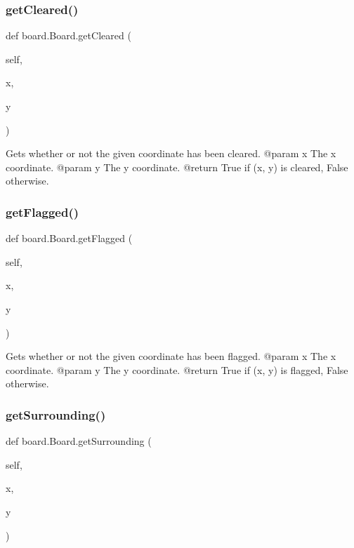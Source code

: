 \subsubsection{\texorpdfstring{getCleared()}{getCleared()}}
{\footnotesize\ttfamily def board.\+Board.\+get\+Cleared (\begin{DoxyParamCaption}\item[{}]{self,  }\item[{}]{x,  }\item[{}]{y }\end{DoxyParamCaption})}

\begin{DoxyVerb}Gets whether or not the given coordinate has been cleared.
@param x The x coordinate.
@param y The y coordinate.
@return True if (x, y) is cleared, False otherwise.
\end{DoxyVerb}
 \mbox{\label{classboard_1_1_board_a1e824cb6d46a2c1cb1e142436b3d012f}} 
\subsubsection{\texorpdfstring{getFlagged()}{getFlagged()}}
{\footnotesize\ttfamily def board.\+Board.\+get\+Flagged (\begin{DoxyParamCaption}\item[{}]{self,  }\item[{}]{x,  }\item[{}]{y }\end{DoxyParamCaption})}

\begin{DoxyVerb}Gets whether or not the given coordinate has been flagged.
@param x The x coordinate.
@param y The y coordinate.
@return True if (x, y) is flagged, False otherwise.
\end{DoxyVerb}
 \mbox{\label{classboard_1_1_board_aa3453607b9850fa2a074ee7595a332f2}} 
\subsubsection{\texorpdfstring{getSurrounding()}{getSurrounding()}}
{\footnotesize\ttfamily def board.\+Board.\+get\+Surrounding (\begin{DoxyParamCaption}\item[{}]{self,  }\item[{}]{x,  }\item[{}]{y }\end{DoxyParamCaption})}

